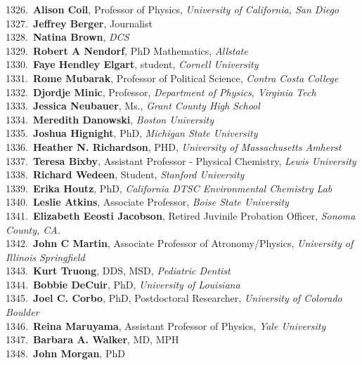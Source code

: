 1326.~{\bf Alison Coil}, Professor of Physics, {\sl University of California, San Diego} \\
1327.~{\bf Jeffrey Berger}, Journalist \\
1328.~{\bf Natina Brown}, {\sl DCS} \\
1329.~{\bf Robert A Nendorf}, PhD Mathematics, {\sl Allstate} \\
1330.~{\bf Faye Hendley Elgart}, student, {\sl Cornell University} \\
1331.~{\bf Rome Mubarak}, Professor of Political Science, {\sl Contra Costa College } \\
1332.~{\bf Djordje Minic}, Professor, {\sl Department of Physics, Virginia Tech} \\
1333.~{\bf Jessica Neubauer}, Ms., {\sl Grant County High School} \\
1334.~{\bf Meredith Danowski}, {\sl Boston University} \\
1335.~{\bf Joshua Hignight}, PhD, {\sl Michigan State University} \\
1336.~{\bf Heather N. Richardson}, PHD, {\sl University of Massachusetts Amherst} \\
1337.~{\bf Teresa Bixby}, Assistant Professor - Physical Chemistry, {\sl Lewis University} \\
1338.~{\bf Richard Wedeen}, Student, {\sl Stanford University} \\
1339.~{\bf Erika Houtz}, PhD, {\sl California DTSC Environmental Chemistry Lab} \\
1340.~{\bf Leslie Atkins}, Associate Professor, {\sl Boise State University} \\
1341.~{\bf Elizabeth Eeosti Jacobson}, Retired Juvinile Probation Officer, {\sl Sonoma County, CA.} \\
1342.~{\bf John C Martin}, Associate Professor of Atronomy/Physics, {\sl University of Illinois Springfield} \\
1343.~{\bf Kurt Truong}, DDS, MSD, {\sl Pediatric Dentist } \\
1344.~{\bf Bobbie DeCuir}, PhD, {\sl University of Louisiana} \\
1345.~{\bf Joel C. Corbo}, PhD, Postdoctoral Researcher, {\sl University of Colorado Boulder} \\
1346.~{\bf Reina Maruyama}, Assistant Professor of Physics, {\sl Yale University} \\
1347.~{\bf Barbara A. Walker}, MD, MPH \\
1348.~{\bf John Morgan}, PhD \\
